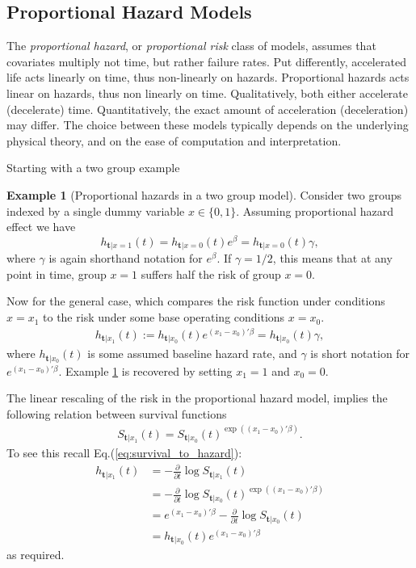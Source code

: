 \documentclass[12pt,a4paper]{report}
\theoremstyle{plain}
\theoremstyle{definition}
\newtheorem{example}{Example}
\newcommand{\set}[1]{\{ #1 \}} \newcommand{\setII}[1]{\left\{ #1 \right\}} \newcommand{\rv}[1]{\mathbf{#1}} \newcommand{\x}{\rv x} \newcommand{\y}{\rv y} \newcommand{\U}{\rv u} \newcommand{\T}{\rv t} \newcommand{\X}{\rv X} \newcommand{\Y}{\rv Y} \newcommand{\expect}[1]{\mathbf{E}\left[ #1 \right]} \newcommand{\expectg}[2]{\mathbf{E}_{\rv{#1}}\left[ \rv{#2} \right]} \newcommand{\expectn}[1]{\mathbb{E}\left[#1\right]} \newcommand{\cov}[1]{\mathbf{Cov} \left[ #1 \right]} \newcommand{\var}[1]{\mathop{Var} \left[ #1 \right]} \newcommand{\covn}[1]{\mathbb{Cov} \left[ #1 \right]} \newcommand{\gauss}[1]{\mathcal{N}\left(#1\right)} \newcommand{\cdf}[2]{F_{#1} (#2)} \newcommand{\survive}[2]{S_{#1} (#2)} \newcommand{\hazard}[2]{h_{#1} (#2)} \newcommand{\cuhazard}[2]{H_{#1} (#2)} \newcommand{\cdfn}[2]{\mathbb{F}_{#1}(#2)} \newcommand{\icdf}[2]{F_\rv{#1}^{-1} (#2)} \newcommand{\icdfn}[2]{\mathbb{F}^{-1}_{#1}(#2)} \newcommand{\pdf}[2]{p_{#1} (#2)} \newcommand{\prob}[1]{P\left( #1 \right)} \newcommand{\dist}{P} \newcommand{\density}{p}
\begin{document}
\subsection{Proportional Hazard Models}
The \emph{proportional hazard}, or \emph{proportional risk} class of models, assumes that covariates multiply not time, but rather failure rates. 
Put differently, accelerated life acts linearly on time, thus non-linearly on hazards. Proportional hazards acts linear on hazards, thus non linearly on time. 
Qualitatively, both either accelerate (decelerate) time. 
Quantitatively, the exact amount of acceleration (deceleration) may differ. 
The choice between these models typically depends on the underlying physical theory, and on the ease of computation and interpretation.

Starting with a two group example
\begin{example}[Proportional hazards in a two group model]
\label{eg:two_group_proportional_hazard}
Consider two groups indexed by a single dummy variable $x \in \set{0,1}$.
Assuming proportional hazard effect we have
$$
	\hazard{\T|x=1}{t}=\hazard{\T|x=0}{t} e^\beta=\hazard{\T|x=0}{t} \gamma, 
$$
where $\gamma$ is again shorthand notation for $e^\beta$.
If $\gamma=1/2$, this means that at any point in time, group $x=1$ suffers half the risk of group $x=0$.
\end{example}


Now for the general case, which compares the risk function under conditions $x=x_1$ to the risk under some base operating conditions $x=x_0$.
\begin{align}
\label{eq:proportional_hazard}
	\hazard{\T|x_1}{t}:=\hazard{\T|x_0}{t} e^{(x_1-x_0)'\beta} = \hazard{\T|x_0}{t} \gamma ,
\end{align}
where $\hazard{\T|x_0}{t}$ is some assumed baseline hazard rate, and $\gamma$ is short notation for $e^{(x_1-x_0)'\beta}$.
Example \ref{eg:two_group_proportional_hazard} is recovered by setting $x_1=1$ and $x_0=0$.


The linear rescaling of the risk in the proportional hazard model, implies the following relation between survival functions
\begin{align}
\label{eq:survival_proportional_hazard}
	\survive{\T|x_1}{t}=\survive{\T|x_0}{t}^{\exp((x_1-x_0)'\beta)}.
\end{align}
To see this recall Eq.(\ref{eq:survival_to_hazard}):
\begin{align*}
\hazard{\T|x_1}{t} 
&=  - \frac{\partial}{\partial t} \log \survive{\T|x_1}{t}  \\
&= - \frac{\partial}{\partial t} \log \survive{\T|x_0}{t}^{\exp((x_1-x_0)'\beta)} \\
&= e^{(x_1-x_0)'\beta} - \frac{\partial}{\partial t}  \log \survive{\T|x_0}{t} \\
&=  \hazard{\T|x_0}{t} e^{(x_1-x_0)'\beta} 
\end{align*}
as required.
\end{document}
